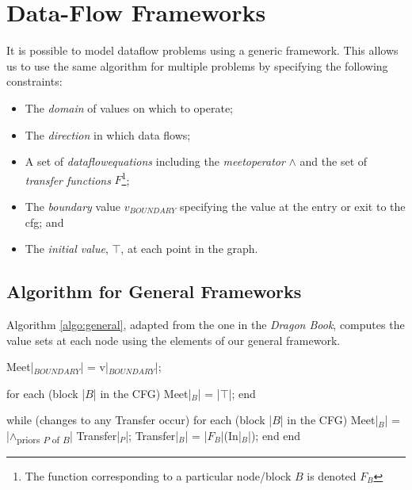 \documentclass[bsc,twoside,singlespacing,parskip,logo,notimes,normalheadings]{infthesis}
\begin{document}
    \section{Data-Flow Frameworks}\label{sec:background-frameworks}

    It is possible to model \gls{dataflow} problems using a generic
    framework. This allows us to use the same algorithm for multiple
    problems by specifying the following constraints\cite[p. 680]{dragonbook}:

    \begin{itemize}
    \item The {\em \gls{domain}} of values on which to operate;
    \item The {\em \gls{direction}} in which data flows;
    \item A set of {\em \gls{dataflowequations}} including the {\em
        \gls{meetoperator}} $\land$ and the set of {\em
        \gls{transfer} functions} $F$\footnote{The function
        corresponding to a particular node/block $B$ is denoted $F_{B}$};
    \item The {\em \gls{boundary}} value $v_{BOUNDARY}$ specifying
      the value at the entry or exit to the \gls{cfg}; and
    \item The {\em initial value}, $\top$, at each point in the graph.
    \end{itemize}
    
        \subsection{Algorithm for General Frameworks}

        Algorithm \ref{algo:general}, adapted from the one in the {\em
          Dragon Book}\cite[p. 691]{dragonbook}, computes the value
        sets at each node using the elements of our general
        framework.

        \begin{algorithm}[caption={Data-Flow Analysis of General Frameworks}, label={algo:general},escapeinside={||},mathescape=true]
Meet|$_{BOUNDARY}$| = v|$_{BOUNDARY}$|;

for each (block |$B$| in the CFG)
    Meet|$_{B}$| = |$\top$|;
end

while (changes to any Transfer occur)
    for each (block |$B$| in the CFG)
        Meet|$_{B}$|     = |$\land$\textsubscript{priors $P$ of $B$}| Transfer|$_{P}$|;
        Transfer|$_{B}$| = |$F_{B}$|(In|$_{B}$|);
    end
end
       \end{algorithm}
\end{document}
